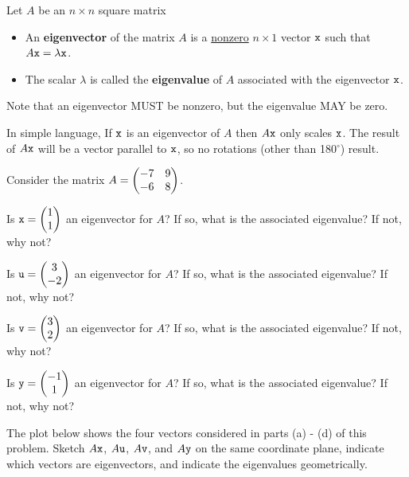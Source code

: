 \begin{definition}
    Let $A$ be an $n \times n$ square matrix  
    \begin{itemize}
        \item An {\bf eigenvector} of the matrix $A$ is a \underline{nonzero} $n \times 1$
            vector $\texttt{x}$ such that $A\texttt{x} = \lambda \texttt{x}$.
        \item The scalar $\lambda$ is called the {\bf eigenvalue} of $A$
            associated with the eigenvector $\texttt{x}$.
    \end{itemize}
    Note that an eigenvector MUST be nonzero, but the eigenvalue MAY be zero.
\end{definition}
In simple language, If $\texttt{x}$ is an eigenvector of $A$ then $A\texttt{x}$ only scales $\texttt{x}$.  The
result of $A\texttt{x}$ will be a vector parallel to $\texttt{x}$, so no rotations (other than
180$^\circ$) result.

% 
\begin{problem}
    Consider the matrix $A= \begin{pmatrix} -7 & 9 \\ -6 & 8 \end{pmatrix}$.
\ba
    \item Is $\texttt{x} = \begin{pmatrix} 1 \\ 1 \end{pmatrix}$ an eigenvector for $A$?  If so, what is the
        associated eigenvalue?  If not, why not?
    \item Is $\texttt{u} = \begin{pmatrix} 3 \\ -2 \end{pmatrix}$ an eigenvector for $A$?  If so, what is the
        associated eigenvalue?  If not, why not?
    \item Is $\texttt{v} = \begin{pmatrix} 3 \\ 2 \end{pmatrix}$ an eigenvector for $A$?  If so, what is the
        associated eigenvalue?  If not, why not?
    \item Is $\texttt{y} = \begin{pmatrix} -1 \\ 1 \end{pmatrix}$ an eigenvector for $A$?  If so, what is the
        associated eigenvalue?  If not, why not?
    \item The plot below shows the four vectors considered in parts (a) - (d) of this
        problem.  Sketch $A\texttt{x}$, $A\texttt{u}$, $A\texttt{v}$, and $A\texttt{y}$ on the same coordinate
        plane, indicate which vectors are eigenvectors, and indicate the eigenvalues
        geometrically.
        \begin{center}
        \end{center}
\ea
\end{problem}

